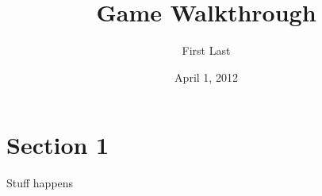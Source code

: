 \documentclass[10pt, twocolumn]{article}
\title{Game Walkthrough}
\author{First Last}
\date{April 1, 2012}
\begin{document}
\maketitle

\section{Section 1}

Stuff happens
\end{document}

